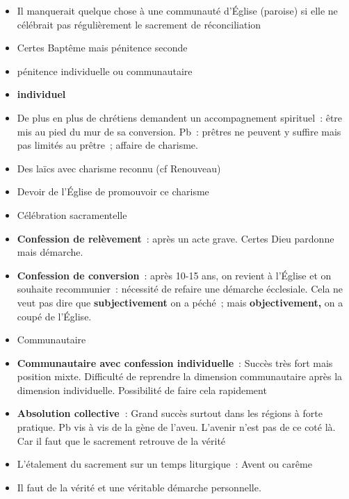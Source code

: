 \begin{itemize}
\item
  Il manquerait quelque chose à une communauté d'Église (paroise) si
  elle ne célébrait pas régulièrement le sacrement de réconciliation
\item
   
  Certes Baptême mais pénitence seconde
   
\item
  pénitence individuelle ou communautaire
\item
   
  \textbf{individuel}
   
\item
   
  De plus en plus de chrétiens demandent un accompagnement spirituel~:
  être mis au pied du mur de sa conversion. Pb~: prêtres ne peuvent y
  suffire mais pas limités au prêtre~; affaire de charisme.
   
\item
   
  Des laïcs avec charisme reconnu (cf Renouveau)
   
\item
   
  Devoir de l'Église de promouvoir ce charisme
   
\item
   
  Célébration sacramentelle
   
\item
   
  \textbf{Confession de relèvement}~: après un acte grave. Certes Dieu
  pardonne mais démarche.
   
\item
   
  \textbf{Confession de conversion}~: après 10-15 ans, on revient à
  l'Église et on souhaite recommunier~: nécessité de refaire une
  démarche écclesiale. Cela ne veut pas dire que \textbf{subjectivement}
  on a péché~; mais \textbf{objectivement,} on a coupé de l'Église.
   
\item
  Communautaire
\item
   
  \textbf{Communautaire avec confession individuelle}~: Succès très fort
  mais position mixte. Difficulté de reprendre la dimension
  communautaire après la dimension individuelle. Possibilité de faire
  cela rapidement
   
\item
   
  \textbf{Absolution collective~}: Grand succès surtout dans les régions
  à forte pratique. Pb vis à vis de la gène de l'aveu. L'avenir n'est
  pas de ce coté là. Car il faut que le sacrement retrouve de la vérité
   
\item
  L'étalement du sacrement sur un temps liturgique~: Avent ou carême
\item
   
  Il faut de la vérité et une véritable démarche personnelle.
   
\end{itemize}

